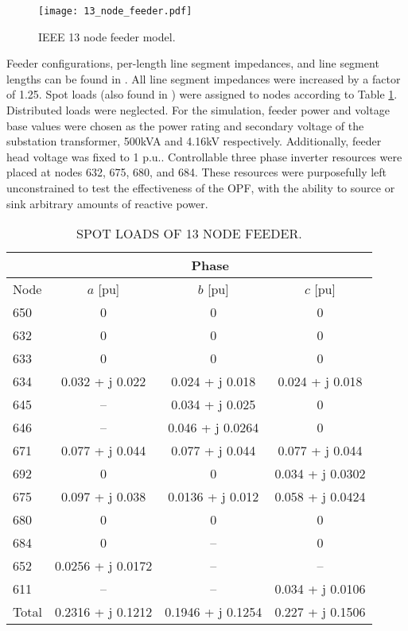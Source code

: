 \begin{figure}[t]
\centering
\texttt{[image: 13\_node\_feeder.pdf]}
\caption{IEEE 13 node feeder model.}
\label{fig:13node}
\end{figure}

Feeder configurations, per-length line segment impedances, and line segment lengths can be found in \cite{IEEEtestfeeder}.  All line segment impedances were increased by a factor of 1.25. Spot loads (also found in \cite{IEEEtestfeeder}) were assigned to nodes according to Table \ref{tab:loads}. Distributed loads were neglected.  For the simulation, feeder power and voltage base values were chosen as the power rating and secondary voltage of the substation transformer, 500kVA and 4.16kV respectively.  Additionally, feeder head voltage was fixed to 1 p.u..  Controllable three phase inverter resources were placed at nodes 632, 675, 680, and 684.  These resources were purposefully left unconstrained to test the effectiveness of the OPF, with the ability to source or sink arbitrary amounts of reactive power. 

\begin{table}[h]
	\caption{SPOT LOADS OF 13 NODE FEEDER.}	
	\begin{center}
		\begin{tabular}{| l | c | c | c |}
        	\hline
        	& \multicolumn{3}{|c|}{Phase } \\
        	\hline
        	Node & $a$ [pu] & $b$ [pu] & $c$ [pu] \\
            \hline
			650 & 0 & 0 & 0 \\
            \hline
            632 & 0 & 0 & 0 \\
            \hline
            633 & 0 & 0 & 0 \\
            \hline
            634 & 0.032 + j 0.022 & 0.024 + j 0.018 & 0.024 + j 0.018 \\
            \hline
            645 & -- & 0.034 + j 0.025 & 0 \\
            \hline
            646 & -- & 0.046 + j 0.0264 & 0 \\
            \hline
            671 & 0.077 + j 0.044 & 0.077 + j 0.044 & 0.077 + j 0.044 \\
            \hline
            692 & 0 & 0 & 0.034 + j 0.0302 \\
            \hline
            675 & 0.097 + j 0.038 & 0.0136 + j 0.012 & 0.058 + j 0.0424 \\
            \hline
            680 & 0 & 0 & 0 \\
            \hline
            684 & 0 & -- & 0 \\
            \hline
            652 & 0.0256 + j 0.0172 & -- & -- \\
            \hline
            611 & -- & -- & 0.034 + j 0.0106 \\
            \hline
            Total & 0.2316 + j 0.1212 & 0.1946 + j 0.1254 & 0.227 + j 0.1506 \\
            \hline
		\end{tabular}
	\end{center}	
	\label{tab:loads}
\end{table}

